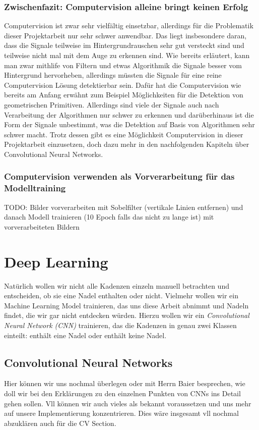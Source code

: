 \documentclass[11pt, a4paper]{article}
\begin{document}
\subsubsection{Zwischenfazit: Computervision alleine bringt keinen Erfolg}
Computervision ist zwar sehr vielfältig einsetzbar, allerdings für die Problematik dieser Projektarbeit nur sehr schwer anwendbar. Das liegt insbesondere daran, dass die Signale teilweise im Hintergrundrauschen sehr gut versteckt sind und teilweise nicht mal mit dem Auge zu erkennen sind. Wie bereits erläutert, kann man zwar mithlife von Filtern und etwas Algorithmik die Signale besser vom Hintergrund hervorheben, allerdings müssten die Signale für eine reine Computervision Lösung detektierbar sein. Dafür hat die Computervision wie bereits am Anfang erwähnt zum Beispiel Möglichkeiten für die Detektion von geometrischen Primitiven. Allerdings sind viele der Signale auch nach Verarbeitung der Algorithmen nur schwer zu erkennen und darüberhinaus ist die Form der Signale unbestimmt, was die Detektion auf Basis von Algorithmen sehr schwer macht. Trotz dessen gibt es eine Möglichkeit Computervision in dieser Projektarbeit einzusetzen, doch dazu mehr in den nachfolgenden Kapiteln über Convolutional Neural Networks.

\subsubsection{Computervision verwenden als Vorverarbeitung für das Modelltraining}
TODO: Bilder vorverarbeiten mit Sobelfilter (vertikale Linien entfernen) und danach Modell trainieren (10 Epoch falls das nicht zu lange ist) mit vorverarbeiteten Bildern

\section{Deep Learning}
Natürlich wollen wir nicht alle Kadenzen einzeln manuell betrachten und entscheiden, ob sie eine Nadel enthalten oder nicht. Vielmehr wollen wir ein Machine Learning Model trainieren, das uns diese Arbeit abnimmt und Nadeln findet, die wir gar nicht entdecken würden. Hierzu wollen wir ein \emph{Convolutional Neural Network (CNN)} trainieren, das die Kadenzen in genau zwei Klassen einteilt: enthält eine Nadel oder enthält keine Nadel.

\subsection{Convolutional Neural Networks}
Hier können wir uns nochmal überlegen oder mit Herrn Baier besprechen, wie doll wir bei den Erklärungen zu den einzelnen Punkten von CNNs ins Detail gehen sollen. Vll können wir auch vieles als bekannt voraussetzen und uns mehr auf unsere Implementierung konzentrieren. Dies wäre insgesamt vll nochmal abzuklären auch für die CV Section.
\end{document}
